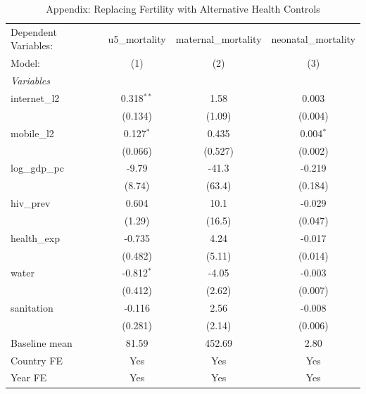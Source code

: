 \begin{table}[htbp]
   \caption{\label{tab:appendix_replace_fertility} Appendix: Replacing Fertility with Alternative Health Controls}
   \centering
   \begin{tabular}{lccc}
      \tabularnewline \midrule \midrule
      Dependent Variables: & u5\_mortality  & maternal\_mortality  & neonatal\_mortality\\   
      Model:               & (1)            & (2)                  & (3)\\  
      \midrule
      \emph{Variables}\\
      internet\_l2         & 0.318$^{**}$   & 1.58                 & 0.003\\   
                           & (0.134)        & (1.09)               & (0.004)\\   
      mobile\_l2           & 0.127$^{*}$    & 0.435                & 0.004$^{*}$\\   
                           & (0.066)        & (0.527)              & (0.002)\\   
      log\_gdp\_pc         & -9.79          & -41.3                & -0.219\\   
                           & (8.74)         & (63.4)               & (0.184)\\   
      hiv\_prev            & 0.604          & 10.1                 & -0.029\\   
                           & (1.29)         & (16.5)               & (0.047)\\   
      health\_exp          & -0.735         & 4.24                 & -0.017\\   
                           & (0.482)        & (5.11)               & (0.014)\\   
      water                & -0.812$^{*}$   & -4.05                & -0.003\\   
                           & (0.412)        & (2.62)               & (0.007)\\   
      sanitation           & -0.116         & 2.56                 & -0.008\\   
                           & (0.281)        & (2.14)               & (0.006)\\   
      Baseline mean        & 81.59          & 452.69               & 2.80\\  
      Country FE           & Yes            & Yes                  & Yes\\  
      Year FE              & Yes            & Yes                  & Yes\\  

\end{tabular}
\end{table}
